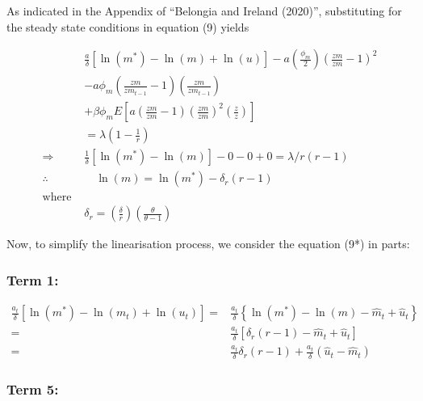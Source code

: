 \documentclass[11pt,preprint, authoryear]{elsarticle}
\numberwithin{equation}{section}
\numberwithin{figure}{section}
\numberwithin{table}{section}
\begin{document}
\newpage

As indicated in the Appendix of ``Belongia and Ireland (2020)'',
substituting for the steady state conditions in equation (9) yields

\[\begin{aligned}
&\frac{a}{\delta}\left[\ln \left(m^{*}\right)-\ln \left(m\right)+\ln \left(u\right)\right]-a\left(\frac{\phi_{m}}{2}\right)\left(\frac{z m}{z m}-1\right)^{2} \\
&-a \phi_{m}\left(\frac{z m}{z m_{t-1}}-1\right)\left(\frac{z m}{z m_{t-1}}\right) \\
& +\beta \phi_{m} E\left[a\left(\frac{z m}{z m}-1\right)\left(\frac{z m}{z m}\right)^{2}\left(\frac{z}{z}\right)\right] \\
&=\lambda\left(1-\frac{1}{r}\right)\\
\Rightarrow &\frac{1}{\delta}\left[\ln \left(m^{*}\right)-\ln \left(m\right)\right]-0-0+0=\lambda/r\left(r-1\right)\\
\therefore &\quad \ln (m) =\ln \left(m^{*}\right)-\delta_{r}(r-1) \\
\text{where }\\
&\delta_{r} =\left(\frac{\delta}{r}\right)\left(\frac{\theta}{\theta-1}\right)
\end{aligned}\]

Now, to simplify the linearisation process, we consider the equation
(9*) in parts:

\hypertarget{term-1-1}{%
\subsubsection{Term 1:}\label{term-1-1}}

\[\begin{aligned}
\frac{a_{t}}{\delta}\left[\ln \left(m^{*}\right)-\ln \left(m_{t}\right)+\ln \left(u_{t}\right)\right]
= &\frac{a_{t}}{\delta}\left\{\ln \left(m^{*}\right)-\ln (m)-\hat{m}_{t}+\hat{u}_{t}\right\} \\
= &\frac{a_{t}}{\delta}\left[\delta_{r}(r-1)-\hat{m}_{t}+\hat{u}_{t}\right] \\
= &\frac{a_{t}}{\delta}\delta_{r}(r-1) + \frac{a_{t}}{\delta} \left( \hat{u}_{t}-\hat{m}_{t} \right)
\end{aligned}\]

\hypertarget{term-5}{%
\subsubsection{Term 5:}\label{term-5}}
\end{document}
